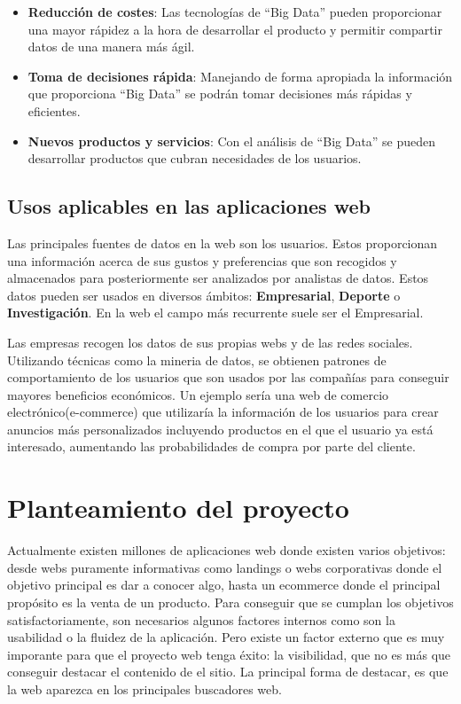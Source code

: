 \begin{itemize}
  \item \textbf{Reducción de costes}: Las tecnologías de ``Big Data'' pueden proporcionar una mayor rápidez a la hora de desarrollar el producto y permitir compartir datos de una manera más ágil.

  \item \textbf{Toma de decisiones rápida}: Manejando de forma apropiada la información que proporciona ``Big Data'' se podrán tomar
  decisiones más rápidas y eficientes.

  \item \textbf{Nuevos productos y servicios}: Con el análisis de ``Big Data'' se pueden desarrollar productos que cubran necesidades de los usuarios.

\end{itemize}

\subsection{Usos aplicables en las aplicaciones web}

Las principales fuentes de datos en la web son los usuarios. Estos proporcionan una información acerca de sus gustos y preferencias que son
recogidos y almacenados para posteriormente ser analizados por analistas de datos. Estos datos pueden ser usados en diversos ámbitos: \textbf{Empresarial}, \textbf{Deporte} o \textbf{Investigación}. En la web el campo más recurrente suele ser el Empresarial.

\vspace{5 mm}

Las empresas recogen los datos de sus propias webs y de las redes sociales. Utilizando técnicas como la mineria de datos, se obtienen patrones de comportamiento de los usuarios que son usados por las compañías para conseguir mayores beneficios económicos. Un ejemplo sería una web de comercio electrónico(e-commerce) que utilizaría la información de los usuarios para crear anuncios más personalizados incluyendo productos en el que el usuario ya está interesado, aumentando las probabilidades de compra por parte del cliente.


\section{Planteamiento del proyecto}

Actualmente existen millones de aplicaciones web donde existen varios objetivos: desde webs puramente informativas como landings o webs
corporativas donde el objetivo principal es dar a conocer algo, hasta un ecommerce donde el principal propósito es la venta de un producto. Para conseguir
que se cumplan los objetivos satisfactoriamente, son necesarios algunos factores internos como son la usabilidad o la fluidez de la aplicación. Pero existe
un factor externo que es muy imporante para que el proyecto web tenga éxito: la visibilidad, que no es más que conseguir destacar el contenido de
el sitio. La principal forma de destacar, es que la web aparezca en los principales buscadores web.


